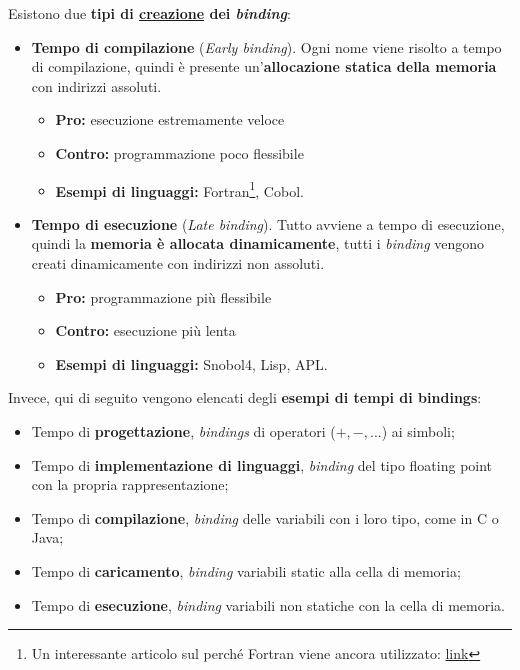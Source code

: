 \documentclass[a4paper]{article}
\begin{document}
	Esistono due \textbf{tipi di \underline{creazione} dei \emph{binding}}:
	\begin{itemize}
		\item \textcolor{Red3}{\textbf{Tempo di compilazione}} (\emph{Early binding}). Ogni nome viene risolto a tempo di compilazione, quindi è presente un'\textbf{allocazione statica della memoria} con indirizzi assoluti.
		\begin{itemize}
			\item \textcolor{Green4}{\textbf{Pro:}} esecuzione estremamente veloce
			
			\item \textcolor{Red3}{\textbf{Contro:}} programmazione poco flessibile
			
			\item \textbf{Esempi di linguaggi:}  Fortran\footnote{Un interessante articolo sul perché Fortran viene ancora utilizzato: \href{https://www.matecdev.com/posts/why-fortran-still-used.html}{link}}, Cobol.
		\end{itemize}
		
		\item \textcolor{Red3}{\textbf{Tempo di esecuzione}} (\emph{Late binding}). Tutto avviene a tempo di esecuzione, quindi la \textbf{memoria è allocata dinamicamente}, tutti i \emph{binding} vengono creati dinamicamente con indirizzi non assoluti.
		\begin{itemize}
			\item \textcolor{Green4}{\textbf{Pro:}} programmazione più flessibile
			
			\item \textcolor{Red3}{\textbf{Contro:}} esecuzione più lenta
			
			\item \textbf{Esempi di linguaggi:} Snobol4, Lisp, APL.
		\end{itemize}
	\end{itemize}
	Invece, qui di seguito vengono elencati degli \textbf{esempi di tempi di bindings}:
	\begin{itemize}
		\item Tempo di \textbf{progettazione}, \emph{bindings} di operatori ($+,-,...$) ai simboli;
		
		\item Tempo di \textbf{implementazione di linguaggi}, \emph{binding} del tipo floating point con la propria rappresentazione;
		
		\item Tempo di \textbf{compilazione}, \emph{binding} delle variabili con i loro tipo, come in C o Java;
		
		\item Tempo di \textbf{caricamento}, \emph{binding} variabili \textsf{static} alla cella di memoria;
		
		\item Tempo di \textbf{esecuzione}, \emph{binding} variabili non statiche con la cella di memoria.
	\end{itemize}
\end{document}
